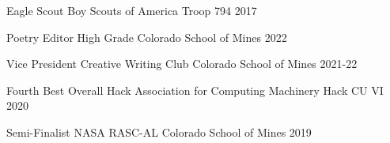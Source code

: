 

\begin{cvhonors}


  \cvhonor
    {Eagle Scout}
    {Boy Scouts of America}
    {Troop 794}
    {2017}


  \cvhonor
    {Poetry Editor}
    {High Grade}
    {Colorado School of Mines}
    {2022}


  \cvhonor
    {Vice President}
    {Creative Writing Club}
    {Colorado School of Mines}
    {2021-22}
    

  \cvhonor
    {Fourth Best Overall Hack}
    {Association for Computing Machinery}
    {Hack CU VI}
    {2020}


  \cvhonor
    {Semi-Finalist}
    {NASA RASC-AL}
    {Colorado School of Mines}
    {2019}


\end{cvhonors}
